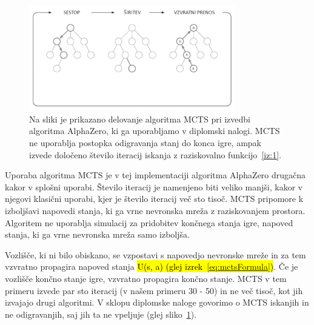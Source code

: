 \documentclass[a4paper, 12pt]{book}
\begin{document}
\begin{figure}[h!]
	\begin{center}
		\includegraphics[width=0.8\textwidth]{photos/modifiedMCTS.pdf}
	\end{center}
	\caption{Na sliki je prikazano delovanje algoritma MCTS pri izvedbi algoritma AlphaZero, ki ga uporabljamo v diplomski nalogi. 
		MCTS ne uporablja postopka odigravanja stanj do konca igre, ampak izvede določeno število iteracij iskanja z raziskovalno funkcijo~\ref{iz:1}. }
	\label{modifiedMCTS}
\end{figure}

Uporaba algoritma MCTS je v tej implementaciji algoritma AlphaZero drugačna kakor v splošni uporabi.
Število iteracij je namenjeno biti veliko manjši, kakor v njegovi klasični uporabi, kjer je število iteracij več sto tisoč. 
MCTS pripomore k izboljšavi napovedi stanja, ki ga vrne nevronska mreža z raziskovanjem prostora.
Algoritem ne uporablja simulacij za pridobitev končnega stanja igre, napoved stanja, ki ga vrne nevronska mreža samo izboljša.

Vozlišče, ki ni bilo obiskano, se vzpostavi s napovedjo nevronske mreže in za tem vzvratno propagira napoved stanja \hl{U(s, a) (glej izrek~{\ref{eq:mctsFormula}})}.
Če je vozlišče končno stanje igre, vzvratno propagira končno stanje.
MCTS v tem primeru izvede par sto iteracij (v našem primeru 30 - 50) in ne več tisoč, kot jih izvajajo drugi algoritmi.
V sklopu diplomske naloge govorimo o MCTS iskanjih in ne odigravanjih, saj jih ta ne vpeljuje (glej sliko~\ref{modifiedMCTS}).
\end{document}
